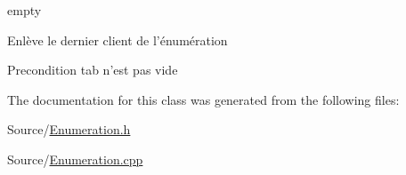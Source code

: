 empty 

\-Enlève le dernier client de l'énumération \begin{DoxyPrecond}{\-Precondition}
tab n'est pas vide 
\end{DoxyPrecond}


\-The documentation for this class was generated from the following files\-:\begin{DoxyCompactItemize}
\item 
\-Source/\hyperlink{Enumeration_8h}{\-Enumeration.\-h}\item 
\-Source/\hyperlink{Enumeration_8cpp}{\-Enumeration.\-cpp}\end{DoxyCompactItemize}
